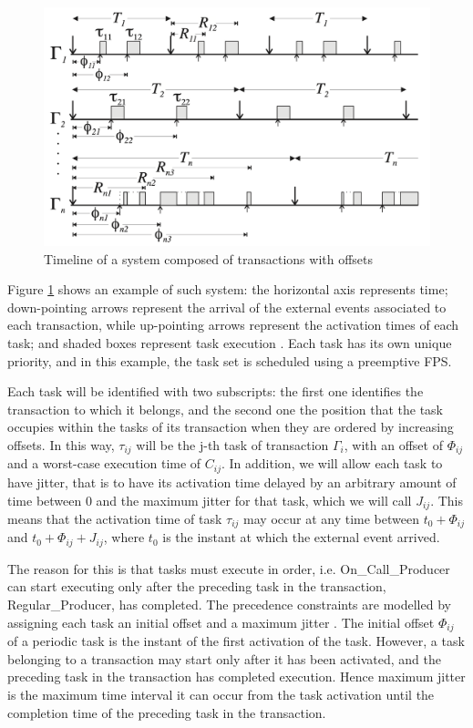\documentclass{article}
\begin{document}
\begin{figure}[!htbp]
\centering
\includegraphics[width=5in]{images/transactions}
\caption{Timeline of a system composed of transactions with offsets \cite{pessimistic-rma}}
\label{transactions}
\end{figure}

Figure \ref{transactions} shows an example of such system: the horizontal axis represents time; down-pointing arrows represent the arrival of the external events associated to each transaction, while up-pointing arrows represent the activation times of each task; and shaded boxes represent task execution \cite{pessimistic-rma}. Each task has its own unique priority, and in this example, the task set is scheduled using a preemptive FPS.

Each task will be identified with two subscripts: the first one identifies the transaction to which it belongs, and the second one the position that the task occupies within the tasks of its transaction when they are ordered by increasing offsets. In this way, $\tau_{ij}$ will be the j-th task of transaction $\Gamma_i$, with an offset of $\Phi_{ij}$ and a worst-case execution time of $C_{ij}$. In addition, we will allow each task to have jitter, that is to have its activation time delayed by an arbitrary amount of time between 0 and the maximum jitter for that task, which we will call $J_{ij}$. This means that the activation time of task $\tau_{ij}$ may occur at any time between $t_0 + \Phi_{ij}$ and $t_0 + \Phi_{ij} + J_{ij}$, where $t_0$ is the instant at which the external event arrived.

The reason for this is that tasks must execute in order, i.e. On\_Call\_Producer can start executing only after the preceding task in the transaction, Regular\_Producer, has completed. The precedence constraints are modelled by assigning each task an initial offset and a maximum jitter \cite{tindell-offsets}. The initial offset $\Phi_{ij}$ of a periodic task is the instant of the first activation of the task. However, a task belonging to a transaction may start only after it has been activated, and the preceding task in the transaction has completed execution. Hence maximum jitter is the maximum time interval it can occur from the task activation until the completion time of the preceding task in the transaction.
\end{document}
